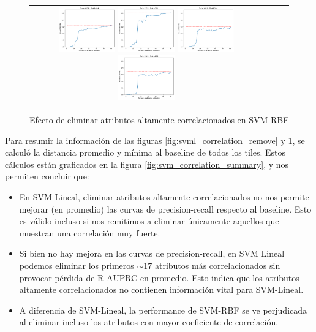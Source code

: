 \begin{figure}[h!]
\begin{tabular}{cccc}
\includegraphics[width=0.25\textwidth]{Kap6/pearson_rbf_INDIVIDUAL_CURVES_train=b278test=b234}  \includegraphics[width=0.25\textwidth]{Kap6/pearson_rbf_INDIVIDUAL_CURVES_train=b278test=b261} 
 \includegraphics[width=0.25\textwidth]{Kap6/pearson_rbf_INDIVIDUAL_CURVES_train=b360test=b234}  \includegraphics[width=0.25\textwidth]{Kap6/pearson_rbf_INDIVIDUAL_CURVES_train=b360test=b278} 
\end{tabular}
\caption{Efecto de eliminar atributos altamente correlacionados en SVM RBF}
\label{fig:svmk_correlation_remove}
\end{figure}

Para resumir la información de las figuras \ref{fig:svml_correlation_remove} y \ref{fig:svmk_correlation_remove}, se calculó la distancia promedio y mínima al baseline de todos los tiles. Estos cálculos están graficados en la figura \ref{fig:svm_correlation_summary}, y nos permiten concluir que:

\begin{itemize}
\item  En SVM Lineal, eliminar atributos altamente correlacionados no nos permite mejorar (en promedio) las curvas de precision-recall respecto al baseline. Esto es válido incluso si nos remitimos a eliminar únicamente aquellos que muestran una correlación muy fuerte.
\item Si bien no hay mejora en las curvas de precision-recall, en SVM Lineal podemos eliminar los primeros $\sim17$ atributos más correlacionados sin provocar pérdida de R-AUPRC en promedio. Esto indica que los atributos altamente correlacionados no contienen información vital para SVM-Lineal.
\item A diferencia de SVM-Lineal, la performance de SVM-RBF se ve perjudicada al eliminar incluso los atributos con mayor coeficiente de correlación. 
\end{itemize}

